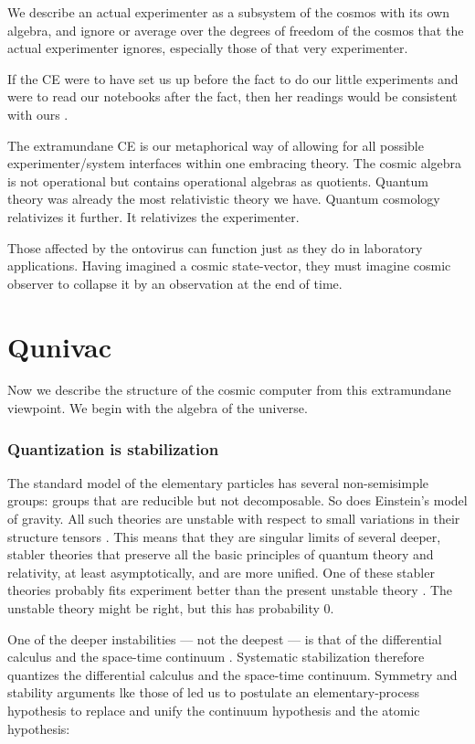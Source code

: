 \documentclass[a4paper,11pt]{article}
\begin{document}
We describe an actual experimenter as a subsystem of the cosmos
with its own algebra,
and  ignore or average over
the  degrees of freedom
of the cosmos that the actual experimenter ignores,
especially those of that very experimenter.

If the  CE
 were to have set us up before the fact to
do our little experiments
and were to read our notebooks after the fact,
then her readings would be consistent 
with ours \cite{NEUMANN}.

The extramundane CE
 is our metaphorical way of allowing 
for all possible experimenter/system interfaces
within one embracing theory.
The cosmic algebra is not operational but
contains operational algebras
as quotients.
Quantum theory
was already
the most relativistic theory we have.
Quantum cosmology relativizes it further.
It relativizes the experimenter.

Those affected by the ontovirus can function just as they do 
in laboratory applications.
Having  imagined a cosmic state-vector,
 they must imagine cosmic
observer  to collapse it by an observation at the end of time.

\part{Qunivac}

Now we describe the structure of the cosmic computer
from this extramundane viewpoint.
We begin with the algebra of the universe.

\section{Quantization is stabilization}

The standard model of the
elementary particles has several non-semisimple groups:
groups that are reducible but not decomposable.
So does Einstein's 
model of gravity.
All such theories are unstable
with respect to small
variations in their
structure tensors
\cite{SEGAL, INONU}.
This means that they are
singular limits of 
several deeper,
stabler theories
that  preserve all
the basic principles 
of quantum theory and
relativity,
at least asymptotically, and
are more unified.
One of these stabler theories
probably fits experiment better
than the present unstable theory
\cite{SEGAL}.
The unstable theory might be right, 
but this
has probability 0.

One of the deeper instabilities
--- not the deepest ---
is that of the 
differential calculus
and the space-time continuum
\cite{SEGAL}.
Systematic stabilization therefore
quantizes the differential calculus
and the space-time continuum.
Symmetry and stability arguments
lke those of \cite{SEGAL}
 led us to postulate 
an
elementary-process hypothesis
to replace and unify
the continuum hypothesis 
and the atomic hypothesis:
\end{document}
